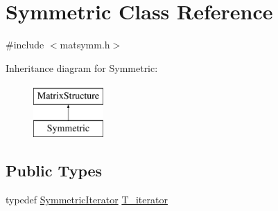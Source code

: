 \hypertarget{classSymmetric}{}\section{Symmetric Class Reference}
\label{classSymmetric}


{\ttfamily \#include $<$matsymm.\+h$>$}

Inheritance diagram for Symmetric\+:\begin{figure}[H]
\begin{center}
\leavevmode
\includegraphics[height=2.000000cm]{classSymmetric}
\end{center}
\end{figure}
\subsection*{Public Types}
\begin{DoxyCompactItemize}
\item 
typedef \hyperlink{classSymmetricIterator}{Symmetric\+Iterator} \hyperlink{classSymmetric_a50668bff9c5fc0f47e71a3998d65571a}{T\+\_\+iterator}
\end{DoxyCompactItemize}
